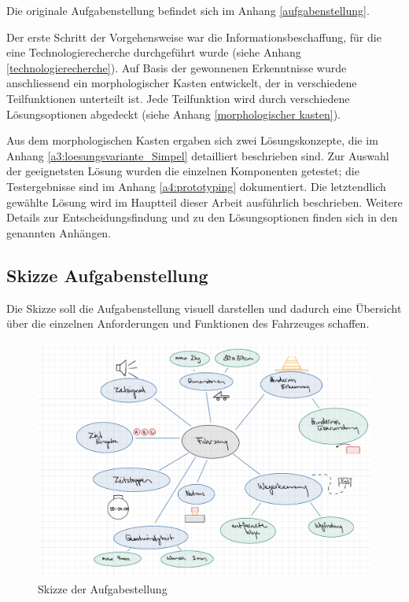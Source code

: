 \documentclass[../main.tex]{subfiles}
\begin{document}
Die originale Aufgabenstellung befindet sich im Anhang \ref{aufgabenstellung}.
\newpage

Der erste Schritt der Vorgehensweise war die Informationsbeschaffung, für die eine Technologierecherche durchgeführt wurde (siehe Anhang \ref{technologierecherche}). Auf Basis der gewonnenen Erkenntnisse wurde anschliessend ein morphologischer Kasten entwickelt, der in verschiedene Teilfunktionen unterteilt ist. Jede Teilfunktion wird durch verschiedene Lösungsoptionen abgedeckt (siehe Anhang \ref{morphologischer kasten}).

Aus dem morphologischen Kasten ergaben sich zwei Lösungskonzepte, die im Anhang \ref{a3:loesungsvariante_Simpel} detailliert beschrieben sind. Zur Auswahl der geeignetsten Lösung wurden die einzelnen Komponenten getestet; die Testergebnisse sind im Anhang \ref{a4:prototyping} dokumentiert. Die letztendlich gewählte Lösung wird im Hauptteil dieser Arbeit ausführlich beschrieben. Weitere Details zur Entscheidungsfindung und zu den Lösungsoptionen finden sich in den genannten Anhängen.


\subsection{Skizze Aufgabenstellung}
Die Skizze soll die Aufgabenstellung visuell darstellen und dadurch eine  Übersicht über die einzelnen Anforderungen und Funktionen des Fahrzeuges schaffen.
    \begin{figure}[H]
        \includegraphics[width=\textwidth]{assets/Skizze_Aufgabenstellung.pdf}
        \caption{Skizze der Aufgabestellung}
        \label{img:Skizze_Aufgabenstellung}
    \end{figure} 
 
\end{document}
